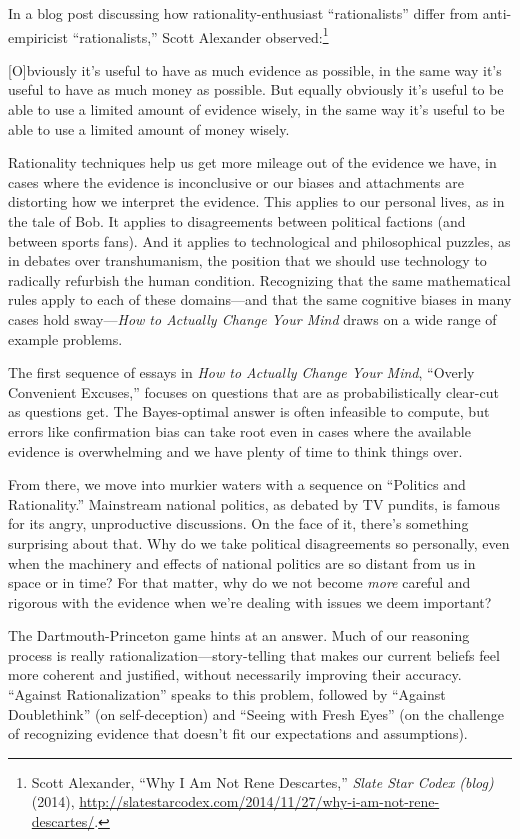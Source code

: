 {
 In a blog post discussing how rationality-enthusiast
``rationalists'' differ from
anti-empiricist ``rationalists,''
Scott Alexander observed:\footnote{Scott Alexander, ``Why I Am Not Rene
Descartes,'' \textit{Slate Star Codex (blog)} (2014),
\url{http://slatestarcodex.com/2014/11/27/why-i-am-not-rene-descartes/}.}}

{
 [O]bviously it's useful to have as much evidence
as possible, in the same way it's useful to have as
much money as possible. But equally obviously it's
useful to be able to use a limited amount of evidence wisely, in the
same way it's useful to be able to use a limited amount
of money wisely.}

{
 Rationality techniques help us get more mileage out of the
evidence we have, in cases where the evidence is inconclusive or our
biases and attachments are distorting how we interpret the evidence.
This applies to our personal lives, as in the tale of Bob. It applies
to disagreements between political factions (and between sports fans).
And it applies to technological and philosophical puzzles, as in
debates over transhumanism, the position that we should use technology
to radically refurbish the human condition. Recognizing that the same
mathematical rules apply to each of these domains---and that the same
cognitive biases in many cases hold sway---\textit{How to Actually
Change Your Mind} draws on a wide range of example problems.}

{
 The first sequence of essays in \textit{How to Actually Change
Your Mind}, ``Overly Convenient
Excuses,'' focuses on questions that are as
probabilistically clear-cut as questions get. The Bayes-optimal answer
is often infeasible to compute, but errors like confirmation bias can
take root even in cases where the available evidence is overwhelming
and we have plenty of time to think things over.}

{
 From there, we move into murkier waters with a sequence on
``Politics and Rationality.''
Mainstream national politics, as debated by TV pundits, is famous for
its angry, unproductive discussions. On the face of it,
there's something surprising about that. Why do we take
political disagreements so personally, even when the machinery and
effects of national politics are so distant from us in space or in
time? For that matter, why do we not become \textit{more} careful and
rigorous with the evidence when we're dealing with
issues we deem important?}

{
 The Dartmouth-Princeton game hints at an answer. Much of our
reasoning process is really rationalization---story-telling that makes
our current beliefs feel more coherent and justified, without
necessarily improving their accuracy. ``Against
Rationalization'' speaks to this problem, followed by
``Against Doublethink'' (on
self-deception) and ``Seeing with Fresh
Eyes'' (on the challenge of recognizing evidence that
doesn't fit our expectations and assumptions).}

